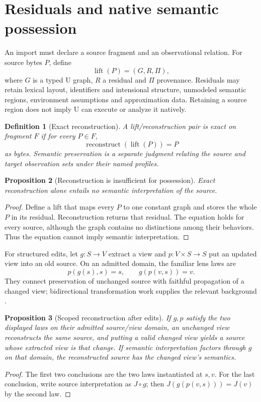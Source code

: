 \documentclass[11pt]{article}
\newtheorem{definition}{Definition}[section]
\newtheorem{proposition}[definition]{Proposition}
\theoremstyle{remark}
\begin{document}
\section{Residuals and native semantic possession}
\label{sec:residuals}

An import must declare a source fragment and an observational relation.
For source bytes $P$, define
\[
 \operatorname{lift}(P)=(G,R,\Pi),
\]
where $G$ is a typed U graph, $R$ a residual and $\Pi$ provenance. Residuals
may retain lexical layout, identifiers and intensional structure, unmodeled
semantic regions, environment assumptions and approximation data. Retaining
a source region does not imply U can execute or analyze it natively.

\begin{definition}[Exact reconstruction]
A lift/reconstruction pair is exact on fragment $F$ if for every $P\in F$,
\[
 \operatorname{reconstruct}(\operatorname{lift}(P))=P
\]
as bytes. Semantic preservation is a separate judgment relating the source
and target observation sets under their named profiles.
\end{definition}

\begin{proposition}[Reconstruction is insufficient for possession]
Exact reconstruction alone entails no semantic interpretation of the source.
\end{proposition}
\begin{proof}
Define a lift that maps every $P$ to one constant graph and stores the whole
$P$ in its residual. Reconstruction returns that residual. The equation
holds for every source, although the graph contains no distinctions among
their behaviors. Thus the equation cannot imply semantic interpretation.
\end{proof}

For structured edits, let $g:S\to V$ extract a view and
$p:V\times S\to S$ put an updated view into an old source. On an admitted
domain, the familiar lens laws are
\[
 p(g(s),s)=s,\qquad g(p(v,s))=v.
\]
They connect preservation of unchanged source with faithful propagation of a
changed view; bidirectional transformation work supplies the relevant
background \cite{foster-lenses}.

\begin{proposition}[Scoped reconstruction after edits]
If $g,p$ satisfy the two displayed laws on their admitted source/view domain,
an unchanged view reconstructs the same source, and putting a valid changed
view yields a source whose extracted view is that change. If semantic
interpretation factors through $g$ on that domain, the reconstructed source
has the changed view's semantics.
\end{proposition}
\begin{proof}
The first two conclusions are the two laws instantiated at $s,v$. For the
last conclusion, write source interpretation as $J\circ g$; then
$J(g(p(v,s)))=J(v)$ by the second law.
\end{proof}
\end{document}

